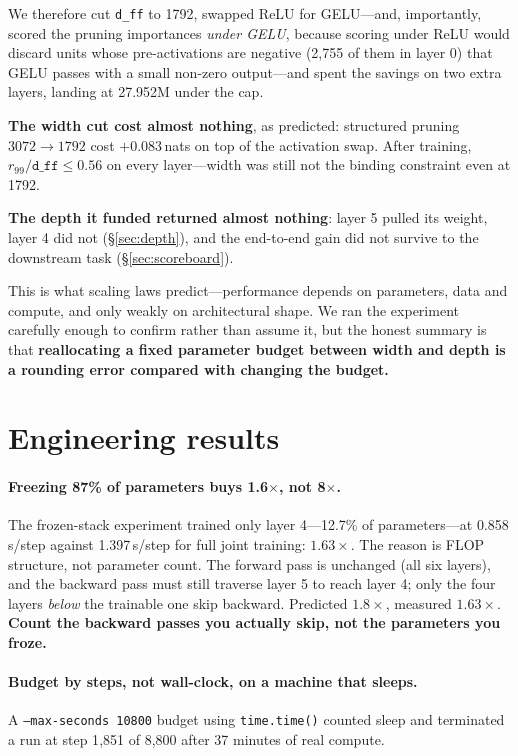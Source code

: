 \documentclass[11pt,a4paper]{article}
\newcommand{\dff}{\texttt{d\_ff}}
\newcommand{\nats}[1]{\ensuremath{#1}\,nats}
\begin{document}
We therefore cut \dff{} to 1792, swapped ReLU for GELU---and, importantly, scored the pruning
importances \emph{under GELU}, because scoring under ReLU would discard units whose
pre-activations are negative (2{,}755 of them in layer 0) that GELU passes with a small
non-zero output---and spent the savings on two extra layers, landing at 27.952M under the cap.

\textbf{The width cut cost almost nothing}, as predicted: structured pruning $3072 \to 1792$
cost \nats{{+}0.083} on top of the activation swap. After training, $r_{99}/\dff \leq 0.56$ on
every layer---width was still not the binding constraint even at 1792.

\textbf{The depth it funded returned almost nothing}: layer 5 pulled its weight, layer 4 did not
(\S\ref{sec:depth}), and the end-to-end gain did not survive to the downstream task
(\S\ref{sec:scoreboard}).

This is what scaling laws predict---performance depends on parameters, data and compute, and
only weakly on architectural shape. We ran the experiment carefully enough to confirm rather
than assume it, but the honest summary is that \textbf{reallocating a fixed parameter budget
between width and depth is a rounding error compared with changing the budget.}

\section{Engineering results}\label{sec:eng}

\paragraph{Freezing 87\% of parameters buys 1.6$\times$, not 8$\times$.} The frozen-stack
experiment trained only layer 4---12.7\% of parameters---at 0.858\,s/step against 1.397\,s/step
for full joint training: $1.63\times$. The reason is FLOP structure, not parameter count. The
forward pass is unchanged (all six layers), and the backward pass must still traverse layer 5
to reach layer 4; only the four layers \emph{below} the trainable one skip backward. Predicted
$1.8\times$, measured $1.63\times$. \textbf{Count the backward passes you actually skip, not the
parameters you froze.}

\paragraph{Budget by steps, not wall-clock, on a machine that sleeps.} A
\texttt{--max-seconds 10800} budget using \texttt{time.time()} counted sleep and terminated a
run at step 1{,}851 of 8{,}800 after 37 minutes of real compute.
\end{document}
